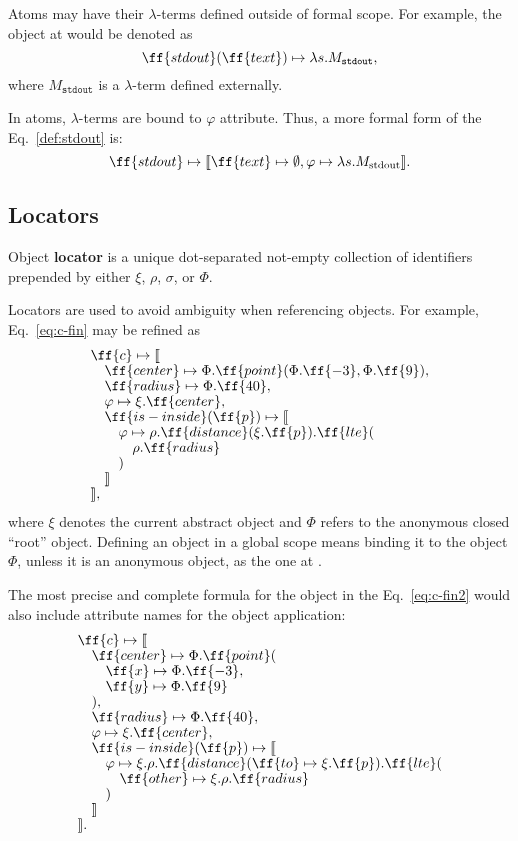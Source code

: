 Atoms may have their $\lambda$-terms defined outside of \phic{} formal scope.
For example, the object at  would be denoted as
\begin{equation}\label{def:stdout}
\ff{stdout}(\ff{text}) \mapsto \lambda s.M_\texttt{stdout},
\end{equation}
where $M_\texttt{stdout}$ is a $\lambda$-term defined externally.

In atoms, $\lambda$-terms are bound to $\varphi$ attribute.
Thus, a more formal form of the Eq.~\ref{def:stdout} is:
\begin{equation*}
\ff{stdout} \mapsto \llbracket \ff{text} \mapsto \emptyset, \varphi \mapsto \lambda s.M_\text{stdout} \rrbracket.
\end{equation*}


\subsection{Locators}

\begin{eodefinition}\label{def:locator}
Object \textbf{locator} is a unique dot-separated not-empty
collection of identifiers prepended by either $\xi$, $\rho$, $\sigma$, or $\Phi$.
\end{eodefinition}

Locators are used to avoid ambiguity when referencing objects.
For example, Eq.~\ref{eq:c-fin} may be refined as
\begin{equation}
\begin{split}
& \ff{c} \mapsto \llbracket \br
& \quad \ff{center} \mapsto \Phi.\ff{point}(\Phi.\ff{-3}, \Phi.\ff{9}), \br
& \quad \ff{radius} \mapsto \Phi.\ff{40}, \br
& \quad \varphi \mapsto \xi.\ff{center}, \br
& \quad \ff{is-inside}(\ff{p}) \mapsto \llbracket \br
& \quad \quad \varphi \mapsto \rho.\ff{distance}(\xi.\ff{p}).\ff{lte}( \br
& \quad \quad \quad \rho.\ff{radius} \br
& \quad \quad ) \br
& \quad \rrbracket \br
& \rrbracket,
\end{split}
\end{equation}
where $\xi$ denotes the current abstract object
and $\Phi$ refers to the anonymous closed ``root'' object.
Defining an object in a global scope
means binding it to the object $\Phi$, unless it is an anonymous
object, as the one at .

The most precise and complete formula for the object in the
Eq.~\ref{eq:c-fin2} would also include attribute names for
the object application:
\begin{equation}
\begin{split}
& \ff{c} \mapsto \llbracket \br
& \quad \ff{center} \mapsto \Phi.\ff{point}( \br
& \quad \quad \ff{x} \mapsto \Phi.\ff{-3}, \br
& \quad \quad \ff{y} \mapsto \Phi.\ff{9} \br
& \quad ), \br
& \quad \ff{radius} \mapsto \Phi.\ff{40}, \br
& \quad \varphi \mapsto \xi.\ff{center}, \br
& \quad \ff{is-inside}(\ff{p}) \mapsto \llbracket \br
& \quad \quad \varphi \mapsto \xi.\rho.\ff{distance}(\ff{to} \mapsto \xi.\ff{p}).\ff{lte}( \br
& \quad \quad \quad \ff{other} \mapsto \xi.\rho.\ff{radius} \br
& \quad \quad ) \br
& \quad \rrbracket \br
& \rrbracket.
\end{split}
\end{equation}

